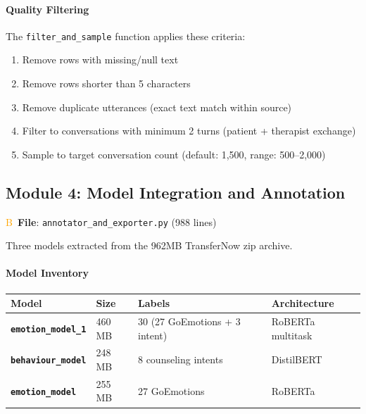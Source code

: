 \documentclass[11pt,a4paper]{article}
\begin{document}
\paragraph{Quality Filtering}

The \texttt{filter\_and\_sample} function applies these criteria:
\begin{enumerate}[label=\textcolor{orange}{\textsf{F}}\ \arabic*., leftmargin=*]
\item Remove rows with missing/null text
\item Remove rows shorter than 5 characters
\item Remove duplicate utterances (exact text match within source)
\item Filter to conversations with minimum 2 turns (patient + therapist exchange)
\item Sample to target conversation count (default: 1{,}500, range: 500--2{,}000)
\end{enumerate}

\subsection{Module 4: Model Integration and Annotation}
\textcolor{orange}{\textsf{B}}\ \textbf{File}: \texttt{annotator\_and\_exporter.py} (988 lines)

\begin{tcolorbox}[infoBox={Pre-Trained Model Archive}]
Three models extracted from the 962MB TransferNow zip archive.
\end{tcolorbox}

\paragraph{Model Inventory}

\begin{center}
\begin{tcolorbox}[colback=white, colframe=teal, enhanced, breakable, title=Pre-Trained Models from TransferNow Archive, fonttitle=\sffamily\bfseries]
\begin{tabular}{>{\sffamily\bfseries}p{3cm}p{2.5cm}p{2.5cm}p{4cm}}
\toprule
\textbf{Model} & \textbf{Size} & \textbf{Labels} & \textbf{Architecture} \\
\midrule
\texttt{emotion\_model\_1} & 460 MB & 30 (27 GoEmotions + 3 intent) & RoBERTa multitask \\
\texttt{behaviour\_model} & 248 MB & 8 counseling intents & DistilBERT \\
\texttt{emotion\_model} & 255 MB & 27 GoEmotions & RoBERTa \\
\bottomrule
\end{tabular}
\end{tcolorbox}
\end{center}
\end{document}
